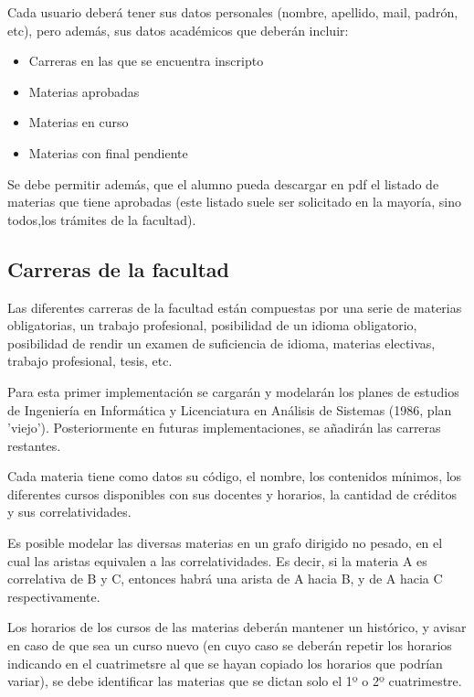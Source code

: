\documentclass[a4paper]{article}
\begin{document}
Cada usuario deberá tener sus datos personales (nombre, apellido, mail, padrón, etc), pero además, sus datos académicos que deberán incluir:

\begin{itemize}
	\item Carreras en las que se encuentra inscripto
	\item Materias aprobadas
	\item Materias en curso
	\item Materias con final pendiente
\end{itemize}

Se debe permitir además, que el alumno pueda descargar en pdf el listado de materias que tiene aprobadas (este listado suele ser solicitado en la mayoría, sino todos,los trámites de la facultad).

\subsection{Carreras de la facultad}

Las diferentes carreras de la facultad están compuestas por una serie de materias obligatorias, un trabajo profesional, posibilidad de un idioma obligatorio, posibilidad de rendir un examen de suficiencia de idioma, materias electivas, trabajo profesional, tesis, etc.

Para esta primer implementación se cargarán y modelarán los planes de estudios de Ingeniería en Informática y Licenciatura en Análisis de Sistemas (1986, plan 'viejo'). Posteriormente en futuras implementaciones, se añadirán las carreras restantes.

Cada materia tiene como datos su código, el nombre, los contenidos mínimos, los diferentes cursos disponibles con sus docentes y horarios, la cantidad de créditos y sus correlatividades.

Es posible modelar las diversas materias en un grafo dirigido no pesado, en el cual las aristas equivalen a las correlatividades. Es decir, si la materia A es correlativa de B y C, entonces habrá una arista de A hacia B, y de A hacia C respectivamente.\newline


Los horarios de los cursos de las materias deberán mantener un histórico, y avisar en caso de que sea un curso nuevo (en cuyo caso se deberán repetir los horarios indicando en el cuatrimetsre al que se hayan copiado los horarios que podrían variar), se debe identificar las materias que se dictan solo el 1º o 2º cuatrimestre.
\end{document}
